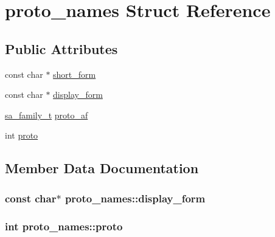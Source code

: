 \hypertarget{structproto__names}{}\section{proto\+\_\+names Struct Reference}
\label{structproto__names}
\subsection*{Public Attributes}
\begin{DoxyCompactItemize}
\item 
const char $\ast$ \hyperlink{structproto__names_a1ccc0798c13e01b57d2ef508ec9dcae3}{short\+\_\+form}
\item 
const char $\ast$ \hyperlink{structproto__names_a878a31fd5b0cb702a91c2d4c5af3d2f3}{display\+\_\+form}
\item 
\hyperlink{syshead_8h_a27a82860cef19f4a53f68516e7b2ee0e}{sa\+\_\+family\+\_\+t} \hyperlink{structproto__names_acfd7d8fd6a479081780aee59f1d2071d}{proto\+\_\+af}
\item 
int \hyperlink{structproto__names_ab269e345ab3b3625db7008119e94c863}{proto}
\end{DoxyCompactItemize}


\subsection{Member Data Documentation}
\hypertarget{structproto__names_a878a31fd5b0cb702a91c2d4c5af3d2f3}{}
\subsubsection[{display\+\_\+form}]{\setlength{\rightskip}{0pt plus 5cm}const char$\ast$ proto\+\_\+names\+::display\+\_\+form}\label{structproto__names_a878a31fd5b0cb702a91c2d4c5af3d2f3}
\hypertarget{structproto__names_ab269e345ab3b3625db7008119e94c863}{}
\subsubsection[{proto}]{\setlength{\rightskip}{0pt plus 5cm}int proto\+\_\+names\+::proto}\label{structproto__names_ab269e345ab3b3625db7008119e94c863}
\hypertarget{structproto__names_acfd7d8fd6a479081780aee59f1d2071d}{}
